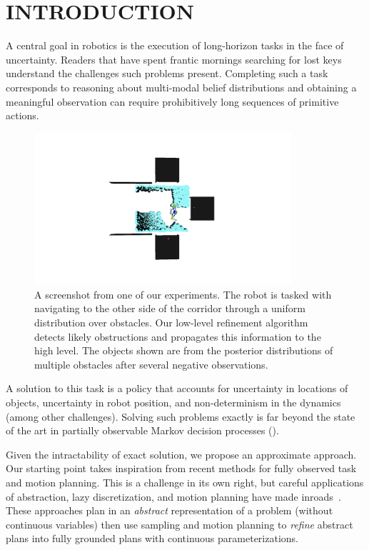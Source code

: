 \section{INTRODUCTION}
A central goal in robotics is the execution of long-horizon tasks in
the face of uncertainty. Readers that have spent frantic mornings
searching for lost keys understand the challenges such problems
present. Completing such a task corresponds to reasoning about
multi-modal belief distributions and obtaining a meaningful observation
can require prohibitively long sequences of primitive actions.
\begin{figure}[h]
  \centering
    \noindent
    \includegraphics[trim = 160mm 90mm 0mm 90mm, clip, width=0.85\textwidth]{corridor_images/corridor_path_2.png}
  \caption{A screenshot from one of our experiments. The robot is
    tasked with navigating to the other side of the corridor through a
    uniform distribution over obstacles. Our low-level refinement
    algorithm detects likely obstructions and propagates
    this information to the high level. The objects shown are from the
    posterior distributions of multiple obstacles after several
    negative observations.}
  \label{fig:knot_steps}
\end{figure}

A solution to this task is a policy that accounts for uncertainty in
locations of objects, uncertainty in robot position, and
non-determinism in the dynamics (among other challenges). Solving such
problems exactly is far beyond the state of the art in partially
observable Markov decision processes (\pomdp).

Given the intractability of exact solution, we propose an approximate
approach. Our starting point takes inspiration from recent methods for
fully observed task and motion planning. This is a challenge in its
own right, but careful applications of abstraction, lazy
discretization, and motion planning have made
inroads~\cite{srivastava2014combined, lozano2014constraint}. These
approaches plan in an \emph{abstract} representation of a problem
(without continuous variables) then use sampling and motion planning
to \emph{refine} abstract plans into fully grounded plans with
continuous parameterizations.

